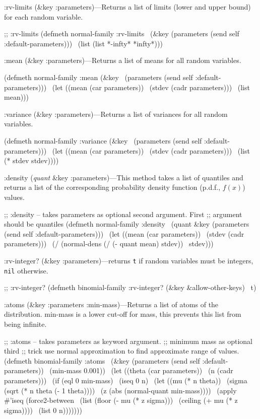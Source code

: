 \meth :rv-limits (\&key :parameters)---Returns a list of limits (lower
and upper bound) for each random variable.

\begincode
;; :rv-limits
(defmeth normal-family :rv-limits
\         (\&key (parameters (send self :default-parameters)))
\   (list (list *-infty* *infty*)))
\endcode

\meth :mean (\&key :parameters)---Returns a list of means for all
random variables.

\begincode
(defmeth normal-family :mean (\&key
\			      (parameters (send self :default-parameters)))
\  (let ((mean (car parameters))
\	(stdev (cadr parameters)))
\    (list mean)))
\endcode

\meth :variance (\&key :parameters)---Returns a list of variances for
all random variables.

\begincode
(defmeth normal-family :variance (\&key
\			      (parameters (send self :default-parameters)))
\  (let ((mean (car parameters))
\	(stdev (cadr parameters)))
\    (list (* stdev stdev))))
\endcode


\meth :density ({\it quant} \&key :parameters)---This method takes a
list of quantiles and returns a list of the corresponding probability
density function (p.d.f., $f(x)$) values. 

\begincode
;; :density  -- takes parameters as optional second argument.  First
;; argument should be quantiles
(defmeth normal-family :density
\         (quant \&key (parameters (send self :default-parameters)))
\   (let ((mean (car parameters))
\	 (stdev (cadr parameters)))
\     (/ (normal-dens (/ (- quant mean) stdev))
\	stdev)))
\endcode


\meth :rv-integer? (\&key :parameters)---returns {\tt t} if random
variables must be integers, {\tt nil\/} otherwise.

\begincode
;; :rv-integer?   
(defmeth binomial-family :rv-integer? (\&key \&allow-other-keys)
\  t)
\endcode

\meth :atoms (\&key :parameters :min-mass)---Returns a list of atoms of the
distribution.  \:min-mass is a lower cut-off for mass, this prevents
this list from being infinite.

\begincode
;; :atoms  -- takes parameters as keyword argument.  
;; minimum mass as optional third
;; trick use normal approximation to find approximate range of values.
(defmeth binomial-family :atoms
\         (\&key (parameters (send self :default-parameters))
\	       (min-mass 0.001))
\   (let ((theta (car parameters))
\	 (n (cadr parameters)))
\     (if (eql 0 min-mass)
\	 (iseq 0 n)
\       (let ((mu (* n theta))
\	     (sigma (sqrt (* n theta (- 1 theta))))
\	     (z (abs (normal-quant min-mass))))
\	 (apply \#'iseq (force2-between
\			(list (floor (- mu (* z sigma)))
\			      (ceiling (+ mu (* z sigma))))
\			(list 0 n)))))))
\endcode


